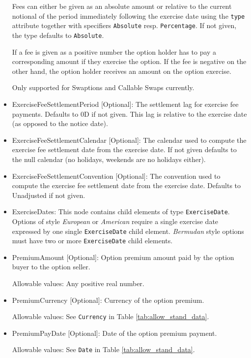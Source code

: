 \begin{itemize}
  Fees can either be given as an absolute amount or relative to the current notional of the period immediately following
  the exercise date using the \verb+type+ attribute together with specifiers \verb+Absolute+ resp. \verb+Percentage+. If
  not given, the type defaults to \verb+Absolute+.

  If a fee is given as a positive number the option holder has to pay a corresponding amount if they exercise the
  option. If the fee is negative on the other hand, the option holder receives an amount on the option exercise.

  Only supported for Swaptions and Callable Swaps currently.

\item ExerciseFeeSettlementPeriod [Optional]: The settlement lag for exercise fee payments. Defaults to 0D if not
  given. This lag is relative to the exercise date (as opposed to the notice date).

\item ExerciseFeeSettlementCalendar [Optional]: The calendar used to compute the exercise fee settlement date from the
  exercise date. If not given defaults to the null calendar (no holidays, weekends are no holidays either).

\item ExerciseFeeSettlementConvention [Optional]: The convention used to compute the exercise fee settlement date from
  the exercise date. Defaults to Unadjusted if not given.

\item ExerciseDates: This node contains child elements of type
  \lstinline!ExerciseDate!.  Options of style \emph{European} or
  \emph{American} require a single exercise date expressed by one
  single \lstinline!ExerciseDate! child element.  \emph{Bermudan}
  style options must have two or more \lstinline!ExerciseDate! child
  elements.

\item PremiumAmount [Optional]: Option premium amount paid by the option buyer to the option seller.

Allowable values:  Any positive real number.

\item PremiumCurrency [Optional]: Currency of the option premium.

Allowable values:  See \lstinline!Currency! in Table \ref{tab:allow_stand_data}.

\item PremiumPayDate [Optional]: Date of the option premium payment.

Allowable values:  See \lstinline!Date! in Table \ref{tab:allow_stand_data}.

\end{itemize}

